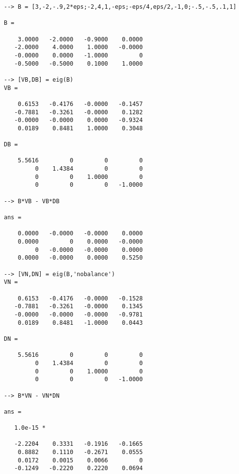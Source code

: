 \begin{verbatim}
--> B = [3,-2,-.9,2*eps;-2,4,1,-eps;-eps/4,eps/2,-1,0;-.5,-.5,.1,1]

B = 

    3.0000   -2.0000   -0.9000    0.0000 
   -2.0000    4.0000    1.0000   -0.0000 
   -0.0000    0.0000   -1.0000         0 
   -0.5000   -0.5000    0.1000    1.0000 

--> [VB,DB] = eig(B)
VB = 

    0.6153   -0.4176   -0.0000   -0.1457 
   -0.7881   -0.3261   -0.0000    0.1282 
   -0.0000   -0.0000    0.0000   -0.9324 
    0.0189    0.8481    1.0000    0.3048 

DB = 

    5.5616         0         0         0 
         0    1.4384         0         0 
         0         0    1.0000         0 
         0         0         0   -1.0000 

--> B*VB - VB*DB

ans = 

    0.0000   -0.0000   -0.0000    0.0000 
    0.0000         0    0.0000   -0.0000 
         0   -0.0000   -0.0000    0.0000 
    0.0000   -0.0000    0.0000    0.5250 

--> [VN,DN] = eig(B,'nobalance')
VN = 

    0.6153   -0.4176   -0.0000   -0.1528 
   -0.7881   -0.3261   -0.0000    0.1345 
   -0.0000   -0.0000   -0.0000   -0.9781 
    0.0189    0.8481   -1.0000    0.0443 

DN = 

    5.5616         0         0         0 
         0    1.4384         0         0 
         0         0    1.0000         0 
         0         0         0   -1.0000 

--> B*VN - VN*DN

ans = 

   1.0e-15 * 

   -2.2204    0.3331   -0.1916   -0.1665 
    0.8882    0.1110   -0.2671    0.0555 
    0.0172    0.0015    0.0066         0 
   -0.1249   -0.2220    0.2220    0.0694 
\end{verbatim}
